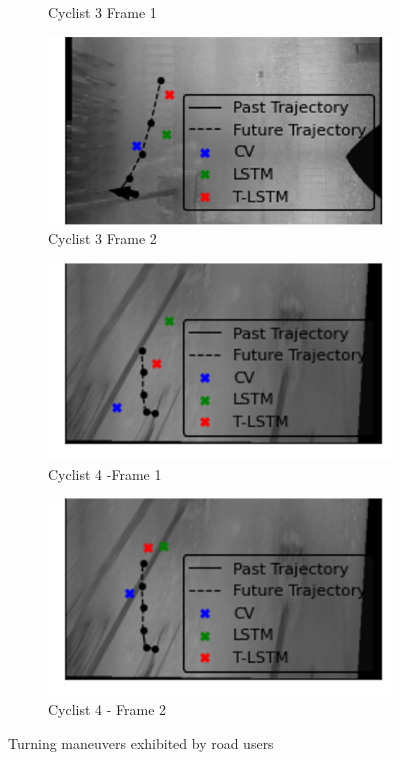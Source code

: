 \documentclass{article}
\begin{document}
\begin{figure}[H]
\begin{subfigure}{0.4\textwidth}
  \caption{Cyclist 3 Frame 1}
  \label{fig:cyc3-1}
\end{subfigure}
\begin{subfigure}{0.4\textwidth}
  \centering
  \includegraphics[width=\linewidth]{quali_results/cyc-4-2.png}
  \caption{Cyclist 3 Frame 2}
  \label{fig:cyc3-2}
\end{subfigure}
\begin{subfigure}{0.4\textwidth}
  \centering
  \includegraphics[width=\linewidth]{quali_results/cyc-2-1.png}
  \caption{Cyclist 4 -Frame 1}
  \label{fig:cyc4-1}
\end{subfigure}
\begin{subfigure}{0.4\textwidth}
  \centering
  \includegraphics[width=\linewidth]{quali_results/cyc-2-2.png}
  \caption{Cyclist 4 - Frame 2}
  \label{fig:cyc4-2}
\end{subfigure}
\caption{Turning maneuvers exhibited by road users}
\label{fig:cyc}
\end{figure}
\end{document}
